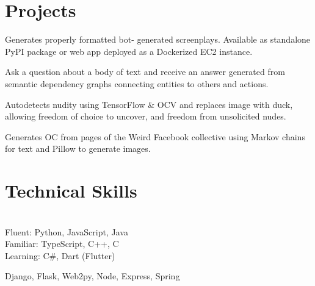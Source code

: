 \documentclass[]{hieudo-build}
\begin{document}
\hfill
\begin{minipage}[t]{0.33\textwidth} 

\section{Projects}
\normalsize Generates properly formatted bot-
generated screenplays. Available as standalone PyPI package or web app deployed as a Dockerized EC2 instance. \\
\sectionsep

\normalsize Ask a question about a body of text and receive an answer generated from semantic dependency graphs connecting entities to others and actions. \\
\sectionsep

\normalsize Autodetects nudity using TensorFlow \& OCV and replaces image with duck, allowing freedom of choice to uncover, and freedom from unsolicited nudes.\\
\sectionsep

\normalsize Generates OC from pages of the Weird Facebook collective using Markov chains for text and Pillow to generate images. \\
\sectionsep 

\section{Technical Skills}
\begin{flushleft}
\narrower
{} 
\smallskip \\
\normalsize
  Fluent: Python, JavaScript, Java \\
  Familiar: TypeScript, C++, C \\
  Learning: C\#, Dart (Flutter)
\sectionsep

\normalsize
  Django, Flask, Web2py, Node, Express, Spring
\sectionsep


\end{flushleft}
\end{minipage}
\end{document}
